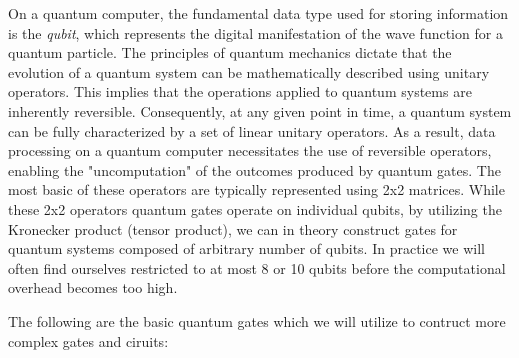 \documentclass[onecolumn,10pt,cleanfoot]{asme2ej}
\begin{document}
On a quantum computer, the fundamental data type used for storing information is the \textit{qubit}, which represents the digital manifestation of the wave function for a quantum particle. The principles of quantum mechanics dictate that the evolution of a quantum system can be mathematically described using unitary operators. This implies that the operations applied to quantum systems are inherently reversible. Consequently, at any given point in time, a quantum system can be fully characterized by a set of linear unitary operators. As a result, data processing on a quantum computer necessitates the use of reversible operators, enabling the "uncomputation" of the outcomes produced by quantum gates. The most basic of these operators are typically represented using 2x2 matrices. While these 2x2 operators quantum gates operate on individual qubits, by utilizing the Kronecker product (tensor product), we can in theory construct gates for quantum systems composed of arbitrary number of qubits. In practice we will often find ourselves restricted to at most 8 or 10 qubits before the computational overhead becomes too high.

The following are the basic quantum gates which we will utilize to contruct more complex gates and ciruits: 
\end{document}
